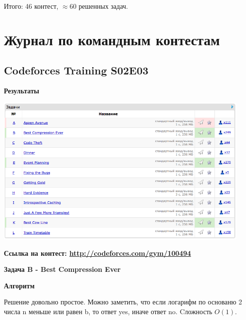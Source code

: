 \documentclass[a4paper,12pt]{article}
\begin{document}
Итого: 46 контест, $\approx$60 решенных задач.


\newpage
\section{Журнал по командным контестам}

%
%
\subsection{Codeforces Training S02E03}

\textbf{{\large Результаты}} \\
\begin{center}
\includegraphics[width=0.95\textwidth]{CT_S02E03/CT_S02E03_result.png}\\ [1cm]
\end{center}

\textbf{{\large Ссылка на контест: \url{http://codeforces.com/gym/100494}}}

\newpage
\textbf{{\large Задача B - Best Compression Ever}}

\begin{center}
\end{center}

\textbf{{\large Алгоритм}}

Решение довольно простое. Можно заметить, что если логарифм по основаню 2 числа n меньше или равен b, то ответ yes, иначе ответ no. Cложность $O(1)$.
\end{document}
